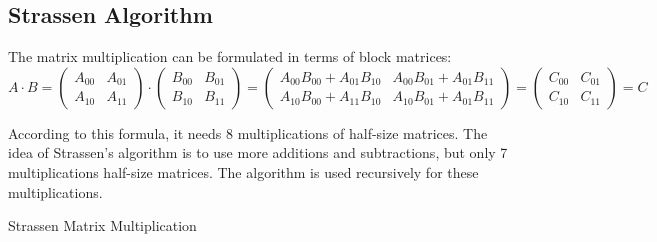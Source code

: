 \documentclass{article}
\begin{document}
\subsection{Strassen Algorithm}

The matrix multiplication can be formulated in terms of block matrices:
$$
A \cdot B =
\begin{pmatrix}
A_{00} & A_{01} \\
A_{10} & A_{11} 
\end{pmatrix}
\cdot
\begin{pmatrix}
B_{00} & B_{01} \\
B_{10} & B_{11} 
\end{pmatrix}
=
\begin{pmatrix}
A_{00}B_{00}+A_{01}B_{10} & A_{00}B_{01}+A_{01}B_{11} \\
A_{10}B_{00}+A_{11}B_{10} & A_{10}B_{01}+A_{01}B_{11} 
\end{pmatrix}
=
\begin{pmatrix}
C_{00} & C_{01} \\
C_{10} & C_{11} 
\end{pmatrix}
= C
$$

According to this formula, it needs 8 multiplications of half-size matrices. 
The idea of Strassen’s algorithm is to use more additions and subtractions,
but only 7 multiplications half-size matrices. The algorithm is used recursively
for these multiplications.

\begin{algorithm}[H] 
\caption{Strassen Matrix Multiplication}
\label{alg:strassen}
\begin{algorithmic}[1]
\Statex
{}
		\State \Return {}
	\EndIf
	 	
	\State {}
\EndFunction
\end{algorithmic}
\end{algorithm}
\end{document}
